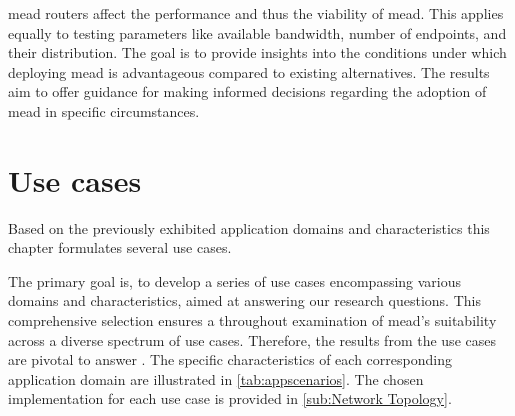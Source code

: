 \begin{enumerate}
            \gls{mead} routers affect the performance and thus the viability of
            \gls{mead}.
        This applies equally to testing parameters like available bandwidth,
            number of endpoints, and their distribution.
        The goal is to provide insights into the conditions under which
            deploying \gls{mead} is advantageous compared to existing
            alternatives.
        The results aim to offer guidance for making informed decisions
            regarding the adoption of \gls{mead} in specific circumstances.
\end{enumerate}


\section{Use cases} %
\label{sec:Use cases}





Based on the previously exhibited application domains and characteristics this
    chapter formulates several use cases.

The primary goal is, to develop a series of use cases encompassing various
    domains and characteristics, aimed at answering our research questions.
This comprehensive selection ensures a throughout examination of \gls{mead}'s
    suitability across a diverse spectrum of use cases.
Therefore, the results from the use cases are pivotal to answer \textit{\rqiii{}}.
The specific characteristics of each corresponding application domain are
    illustrated in \autoref{tab:appscenarios}.
The chosen implementation for each use case is provided in
    \autoref{sub:Network Topology}.

